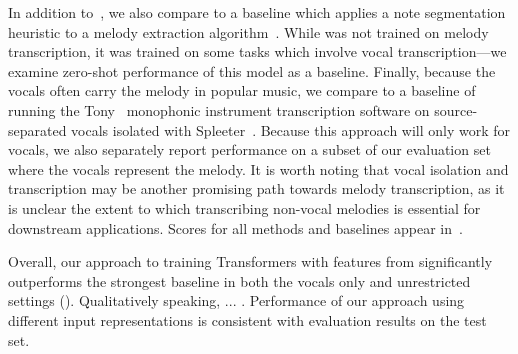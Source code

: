 In addition to~\cite{ryynanen2008accompaniment}, we also compare to a baseline which applies a note segmentation heuristic to a melody extraction algorithm~\cite{salamon2014melody}. 
While \mtthree{} was not trained on melody transcription, it was trained on some tasks which involve vocal transcription---we examine zero-shot performance of this model as a baseline. 
Finally, because the vocals often carry the melody in popular music, we compare to a baseline of running the Tony~\cite{mauch2015computer} monophonic instrument transcription software on source-separated vocals isolated with Spleeter~\cite{hennequin2020spleeter}. 
Because this approach will only work for vocals, we also separately report performance on a subset of our evaluation set where the vocals represent the melody. 
It is worth noting that vocal isolation and transcription may be another promising path towards melody transcription, 
as it is unclear the extent to which transcribing non-vocal melodies is essential for downstream applications.
Scores for all methods and baselines appear in~. 

Overall, our approach to training Transformers with features from \jukebox{} significantly outperforms the strongest baseline in both the vocals only and unrestricted settings (). 
Qualitatively speaking, ... \todo{}.
Performance of our approach using different input representations is consistent with evaluation results on the \hooktheory{} test set. 